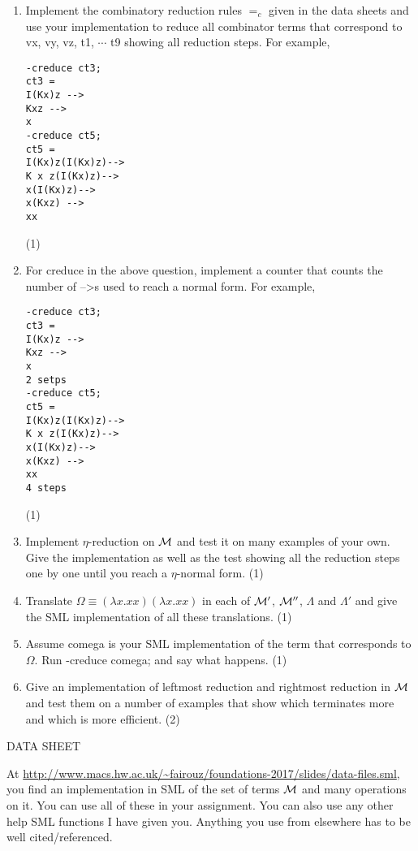 \documentclass[11pt]{article}
\begin{document}
\begin{enumerate}
\item
  Implement the combinatory reduction rules $=_c$ given in the data sheets and use your implementation to reduce
  all combinator terms that correspond to  vx, vy, vz, t1, $\cdots$ t9 showing all reduction steps.  
  For example,
\begin{verbatim}
-creduce ct3;
ct3 =
I(Kx)z -->
Kxz -->
x
-creduce ct5;
ct5 =
I(Kx)z(I(Kx)z)-->
K x z(I(Kx)z)-->
x(I(Kx)z)-->
x(Kxz) -->
xx
  \end{verbatim}
   \hfill{(1)} %
\item
For creduce in the above question, implement a counter that counts the number of -->s used to reach a normal form.  For example, 
\begin{verbatim}
-creduce ct3;
ct3 =
I(Kx)z -->
Kxz -->
x
2 setps
-creduce ct5;
ct5 =
I(Kx)z(I(Kx)z)-->
K x z(I(Kx)z)-->
x(I(Kx)z)-->
x(Kxz) -->
xx
4 steps
  \end{verbatim}
 \hfill{(1)} %
\item
Implement $\eta$-reduction on ${\cal M}$ and test it on many examples of your own.
Give the implementation as well as the test showing all the reduction steps one by one until you reach a $\eta$-normal form. 
  \hfill{(1)} %
\item
Translate $\Omega \equiv (\lambda x.xx)(\lambda x.xx)$ in each of ${\cal M}'$, ${\cal M}''$, $\Lambda$ and $\Lambda'$ and give the SML implementation of all these translations.  
  \hfill{(1)} %
\item
Assume comega is your SML implementation of the term that corresponds to $\Omega$.  Run -creduce comega; and say what happens.  
  \hfill{(1)} %
\item
Give an implementation of leftmost reduction and rightmost reduction in ${\cal M}$ and test them on a number of examples that show which terminates more and which is more efficient. 
   \hfill{(2)} %

\end{enumerate}
\newpage

\begin{center}
\Huge{DATA SHEET}
\end{center}


At \url{http://www.macs.hw.ac.uk/~fairouz/foundations-2017/slides/data-files.sml}, you find an implementation in SML of the set of
terms ${\cal M}$ and many operations on it.  You can use all of these in your assignment.  You can also use any other help SML functions I have given you.  Anything you use from elsewhere has to be well cited/referenced.
\end{document}
